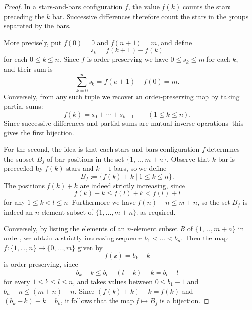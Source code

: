 \begin{proof}
  In a stars-and-bars configuration $f$, the value $f(k)$ counts the stars preceding the $k$\supth{} bar. Successive differences therefore count the stars in the groups separated by the bars.

  More precisely, put $f(0)=0$ and $f(n+1)=m$, and define
  \begin{equation*}
    s_k=f(k+1)-f(k)
  \end{equation*}
  for each $0\leq k\leq n$. Since $f$ is order-preserving we have $0\leq s_k\leq m$ for each $k$, and their sum is
  \begin{equation*}
    \sum_{k=0}^{n}s_k=f(n+1)-f(0)=m.
  \end{equation*}
  Conversely, from any such tuple we recover an order-preserving map by taking partial sums:
  \begin{equation*}
    f(k)=s_0+\cdots +s_{k-1}
    \qquad (1\leq k\leq n).
  \end{equation*}
  Since successive differences and partial sums are mutual inverse operations, this gives the first bijection.

  For the second, the idea is that each stars-and-bars configuration $f$ determines the subset $B_f$ of bar-positions in the set $\{1,\ldots,m+n\}$. Observe that $k$\supth{} bar is preceeded by $f(k)$ stars and $k-1$ bars, so we define
  \begin{equation*}
    B_f:=\{f(k)+k\mid 1\leq k\leq n\}.
  \end{equation*}
  The positions $f(k)+k$ are indeed strictly increasing, since
  \begin{equation*}
    f(k)+k\leq f(l)+k<f(l)+l
  \end{equation*}
  for any $1\leq k<l\leq n$. Furthermore we have $f(n)+n\leq m+n$, so the set $B_f$ is indeed an $n$-element subset of $\{1,\ldots,m+n\}$, as required.

  Conversely, by listing the elements of an $n$-element subset $B$ of $\{1,\ldots,m+n\}$ in order, we obtain a strictly increasing sequence $b_1<\ldots<b_n$. Then the map $f:\{1,\ldots,n\}\to\{0,\ldots,m\}$ given by
  \begin{equation*}
    f(k)=b_k-k
  \end{equation*}
  is order-preserving, since
  \begin{equation*}
    b_k-k\leq b_l-(l-k)-k=b_l-l
  \end{equation*}
  for every $1\leq k\leq l\leq n$, and takes values between $0\leq b_1-1$ and $b_n-n\leq (m+n)-n$. Since $(f(k)+k)-k=f(k)$ and $(b_k-k)+k=b_k$, it follows that the map $f\mapsto B_f$ is a bijection.
\end{proof}

